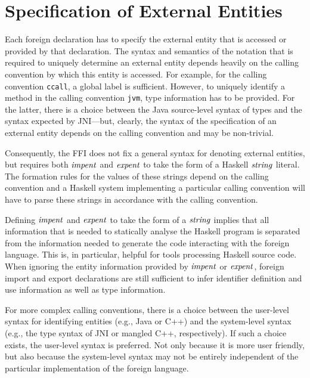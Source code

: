\section{Specification of External Entities}
\label{sec:extent}

Each foreign declaration has to specify the external entity that is accessed
or provided by that declaration.  The syntax and semantics of the notation
that is required to uniquely determine an external entity depends heavily on
the calling convention by which this entity is accessed.  For example, for the
calling convention \mbox{\tt ccall}, a global label is sufficient.  However, to
uniquely identify a method in the calling convention \mbox{\tt jvm}, type
information has to be provided.  For the latter, there is a choice between the
Java source-level syntax of types and the syntax expected by JNI---but,
clearly, the syntax of the specification of an external entity depends on the
calling convention and may be non-trivial.

Consequently, the FFI does not fix a general syntax for denoting external
entities, but requires both \mbox{$\it impent$} and \mbox{$\it expent$} to take the
form of a Haskell \mbox{$\it string$} literal.  The formation rules for the values
of these strings depend on the calling convention and a Haskell system
implementing a particular calling convention will have to parse these strings
in accordance with the calling convention.

Defining \mbox{$\it impent$} and \mbox{$\it expent$} to take the form of a
\mbox{$\it string$} implies that all information that is needed to statically
analyse the Haskell program is separated from the information needed to
generate the code interacting with the foreign language.  This is, in
particular, helpful for tools processing Haskell source code.  When ignoring
the entity information provided by \mbox{$\it impent$} or \mbox{$\it expent$}, foreign
import and export declarations are still sufficient to infer identifier
definition and use information as well as type information.

For more complex calling conventions, there is a choice between the user-level
syntax for identifying entities (e.g., Java or C{+}{+}) and the system-level
syntax (e.g., the type syntax of JNI or mangled C{+}{+}, respectively).  If
such a choice exists, the user-level syntax is preferred.  Not only because it
is more user friendly, but also because the system-level syntax may not be
entirely independent of the particular implementation of the foreign language.


